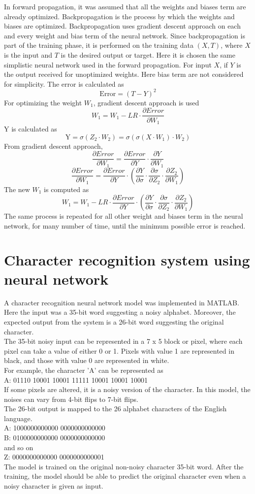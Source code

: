 \documentclass[12pt,a4paper,bold]{thesis}
\theoremstyle{thm}
\theoremstyle{definition}
\begin{document}
In forward propagation, it was assumed that all the weights and biases term are already optimized. Backpropagation is the process by which the weights and biases are optimized. Backpropagation uses gradient descent approach on each and every weight and bias term of the neural network. Since backpropagation is part of the training phase, it is performed on the training data $(X, T)$, where $X$ is the input and $T$ is the desired output or target. 
Here it is chosen the same simplistic neural network used in the forward propagation. For input $X$, if $Y$ is the output received for unoptimized weights. Here bias term are not considered for simplicity. 
The error is calculated as 
\[\text{Error} = (T - Y)^2\]
For optimizing the weight $W_1$, gradient descent approach is used
\[W_1=W_1-LR \cdot \frac{\partial Error}{\partial W_1}\]
Y is calculated as 
\[\text{Y}=\sigma(Z_2 \cdot W_2)=\sigma(\sigma(X \cdot W_1)\cdot W_2)\]
From gradient descent approach,
\[\frac{\partial Error}{\partial W_1}=\frac{\partial Error}{\partial Y} \cdot \frac{\partial Y}{\partial W_1}\]
\[\frac{\partial Error}{\partial W_1}=\frac{\partial Error}{\partial Y} \cdot (\frac{\partial Y}{\partial \sigma}\cdot \frac{\partial \sigma}{\partial Z_2} \cdot \frac{\partial Z_2}{\partial W_1})\]
The new $W_1$ is computed as
\[W_1=W_1-LR \cdot \frac{\partial Error}{\partial Y} \cdot (\frac{\partial Y}{\partial \sigma}\cdot \frac{\partial \sigma}{\partial Z_2} \cdot \frac{\partial Z_2}{\partial W_1})\]
The same process is repeated for all other weight and biases term in the neural network, for many number of time, until the minimum possible error is reached.
\section{Character recognition system using neural network}
A character recognition neural network model was implemented in MATLAB. Here the input was a 35-bit word suggesting a noisy alphabet. Moreover, the expected output from the system is a 26-bit word suggesting the original character.\\
The 35-bit noisy input can be represented in a 7 x 5 block or pixel, where each pixel can take a value of either 0 or 1. Pixels with value 1 are represented in black, and those with value 0 are represented in white.\\
For example, the character 'A' can be represented as\\ 
A: 01110 10001 10001 11111 10001 10001 10001\\
If some pixels are altered, it is a noisy version of the character. In this model, the noises can vary from 4-bit flips to 7-bit flips.\\
The 26-bit output is mapped to the 26 alphabet characters of the English language.\\
A: 1000000000000 0000000000000\\
B: 0100000000000 0000000000000\\
and so on\\
Z: 0000000000000 0000000000001\\
The model is trained on the original non-noisy character 35-bit word. After the training, the model should be able to predict the original character even when a noisy character is given as input.
\end{document}
